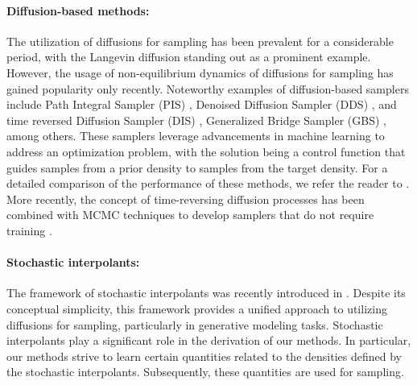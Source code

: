 \paragraph{Diffusion-based methods:} 
The utilization of diffusions for sampling has been prevalent for a considerable period, with the Langevin diffusion standing out as a prominent example. However, the usage of non-equilibrium dynamics of diffusions for sampling has gained popularity only recently. Noteworthy examples of diffusion-based samplers include Path Integral Sampler (PIS) \cite{zhang_path_2022}, Denoised Diffusion Sampler (DDS) \cite{vargas_denoising_2022}, and time reversed Diffusion Sampler (DIS) \cite{berner_optimal_2023}, Generalized Bridge Sampler (GBS) \cite{richter_improved_2023}, among others. These samplers leverage advancements in machine learning to address an optimization problem, with the solution being a control function that guides samples from a prior density to samples from the target density. For a detailed comparison of the performance of these methods, we refer the reader to \cite{blessing_beyond_2024}. More recently, the concept of time-reversing diffusion processes has been combined with MCMC techniques to develop samplers that do not require training \cite{grenioux_stochastic_2024,huang_reverse_2023}.
\paragraph{Stochastic interpolants:} 
The framework of stochastic interpolants was recently introduced in \cite{albergo_stochastic_2023}. Despite its conceptual simplicity, this framework provides a unified approach to utilizing diffusions for sampling, particularly in generative modeling tasks. Stochastic interpolants play a significant role in the derivation of our methods. In particular, our methods strive to learn certain quantities related to the densities defined by the stochastic interpolants. Subsequently, these quantities are used for sampling.
